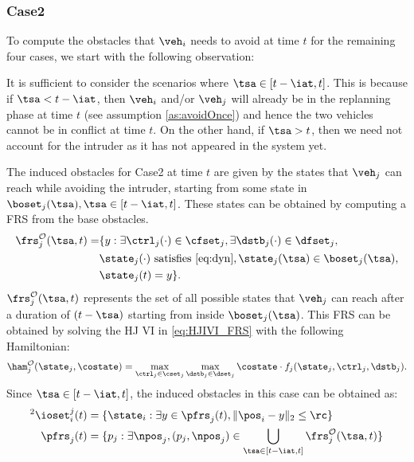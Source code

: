 \subsubsection{Case2} \label{sec:intruderObs_case2}
To compute the obstacles that $\veh_i$ needs to avoid at time $t$ for the remaining four cases, we start with the following observation:
\begin{observation} \label{obs0_case2}
It is sufficient to consider the scenarios where $\tsa \in [t-\iat, t]$. This is because if $\tsa < t - \iat$, then $\veh_i$ and/or $\veh_j$ will already be in the replanning phase at time $t$ (see assumption \ref{as:avoidOnce}) and hence the two vehicles cannot be in conflict at time $t$. On the other hand, if $\tsa > t$, then we need not account for the intruder as it has not appeared in the system yet. %
\end{observation}

The induced obstacles for Case2 at time $t$ are given by the states that $\veh_j$ can reach while avoiding the intruder, starting from some state in $\boset_j(\tsa), \tsa \in [t-\iat, t]$. These states can be obtained by computing a FRS from the base obstacles.
\begin{equation} \label{eq:ObsFRS_case2}
\begin{aligned}
\frs_{j}^{\mathcal{O}}(\tsa, t) = & \{y: \exists \ctrl_j(\cdot) \in \cfset_j, \exists \dstb_j(\cdot) \in \dfset_j, \\
& \state_j(\cdot) \text{ satisfies \eqref{eq:dyn}}, \state_j(\tsa) \in \boset_j(\tsa), \\
& \state_j(t) = y\}.
\end{aligned}
\end{equation}
$\frs_{j}^{\mathcal{O}}(\tsa, t)$ represents the set of all possible states that $\veh_j$ can reach after a duration of $(t-\tsa)$ starting from inside $\boset_j(\tsa)$. This FRS can be obtained by solving the HJ VI in \eqref{eq:HJIVI_FRS} with the following Hamiltonian:
\begin{equation}
\ham_{j}^{\mathcal{O}}(\state_j, \costate) = \max_{\ctrl_j \in \cset_j} \max_{\dstb_j \in \dset_j} \costate \cdot f_j (\state_j, \ctrl_j, \dstb_j).
\end{equation} 
Since $\tsa \in [t-\iat, t]$, the induced obstacles in this case can be obtained as:
\begin{equation} \label{eq:intruderObs_case2} 
\begin{aligned}
^2\ioset_i^j(t) & = \{\state_i: \exists y \in \pfrs_j(t), \|\pos_i - y\|_2 \le \rc \}\\
\pfrs_j(t) & = \{p_j: \exists \npos_j, (p_j, \npos_j) \in \bigcup_{\tsa \in [t-\iat, t]} \frs_{j}^{\mathcal{O}}(\tsa, t) \}
\end{aligned}
\end{equation}

